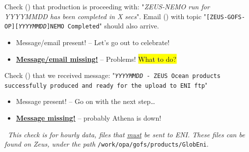 \documentclass[twocolumn,8pt]{article}
\begin{document}
\begin{mdframed}[frametitle=(A.2)\ -- At 10 pm\hfill\faMoonO]

Check (\faSend) that production is proceeding with:
"\textit{ZEUS-NEMO run for \textit{YYYYMMDD} has been completed in \textit{X} secs}". Email (\faEnvelope) with topic "\texttt{[ZEUS-GOFS-OP][\textit{YYYYMMDD}]NEMO Completed}" should also arrive.
    \begin{itemize}\itemsep0pt
        \item[{\textcolor{ForestGreen}{\faCheckCircle}}] Message/email present! -- Let's go out to celebrate!
        \item[{\textcolor{Red}{\faTimesCircle}}] \ul{\textbf{Message/email missing!}} -- Problems! \hl{What to do?}
    \end{itemize}
\end{mdframed}


\begin{mdframed}[frametitle=(B.0)\ -- At 9 am\hfill\faSunO]

Check (\faSend) that we received message: "\texttt{\textit{YYYYMMDD} - ZEUS Ocean prod\-ucts successfully produced and ready for the upload to ENI ftp}"
    \begin{itemize}\itemsep0pt
        \item[{\textcolor{ForestGreen}{\faCheckCircle}}] Message present! -- Go on with the next step\dots
        \item[{\textcolor{Red}{\faTimesCircle}}] \ul{\textbf{Message missing!}} -- probably Athena is down!
    \end{itemize}

\faInfoCircle\ \textit{This check is for hourly data, files that \ul{must} be sent to ENI. These files can be found on Zeus, under the path} \texttt{/work/opa/gofs/products/GlobEni}.

\end{mdframed}
\end{document}
